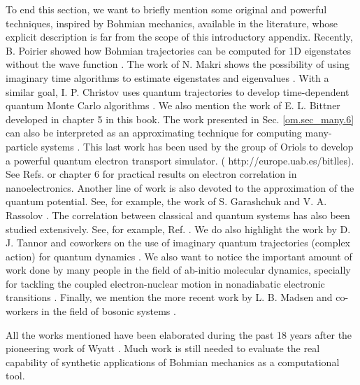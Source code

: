 \documentclass[nofootinbib, secnumarabic, amsmath, nobibnotes,11pt,aps,pra, floatfix]{revtex4-1}
\newcommand{\sref}[1]{Sec. \ref{#1}}
\begin{document}
To end this section, we want to briefly mention some original and
powerful techniques, inspired by Bohmian mechanics, available in the
literature, whose explicit description is far from the scope of this
introductory appendix. Recently, B. Poirier showed how Bohmian
trajectories can be computed for 1D eigenstates without the wave
function \cite{om.poirier}. The work of N. Makri shows the possibility of using
imaginary time algorithms to estimate eigenstates and eigenvalues
\cite{om.imaginarytime}. With a similar goal, I. P. Christov uses
quantum trajectories to develop time-dependent quantum Monte Carlo
algorithms \cite{om.ivan,om.ivan2}. We also mention the work of E.
L. Bittner \cite{om.extra16} developed in chapter 5 in this book.
The work presented in \sref{om.sec_many.6} can also be interpreted as an
approximating technique for computing many-particle systems
\cite{om.oriolsprl}. This last work has been used by the group of
Oriols to develop a powerful quantum electron transport simulator. (
http://europe.uab.es/bitlles). See Refs.
\cite{om.oriolsexample1,om.oriolsexample2} or chapter 6 for
practical results on electron correlation in nanoelectronics.
Another line of work is also devoted to the approximation of the
quantum potential. See, for example, the work of S. Garashchuk and
V. A. Rassolov \cite{om.gara}. The correlation between classical and
quantum systems has also been studied extensively. See, for example,
Ref. \cite{om.extra13,om.5marian,om.6colomes}. We do also highlight the work by D. J.
Tannor and coworkers on the use of imaginary quantum trajectories
(complex action) for quantum dynamics
\cite{om.imaginaryaction,om.imaginaryactionprl}. We also want to notice the important amount of work done by many people in the field of ab-initio molecular dynamics, specially for tackling the coupled electron-nuclear motion in nonadiabatic electronic transitions \cite{om.extra18,om.extra19,om.extra20,om.extra21,om.extra22,om.extra23,om.extra24}. Finally, we mention the more recent work by L. B. Madsen and co-workers in the field of bosonic systems \cite{om.extra25}.


All the works mentioned have been elaborated during the past 18
years after the pioneering work of Wyatt
\cite{om.Wyatt1,om.extra17}. Much work is still needed to evaluate
the real capability of synthetic applications of Bohmian mechanics
as a computational tool.%
\end{document}
